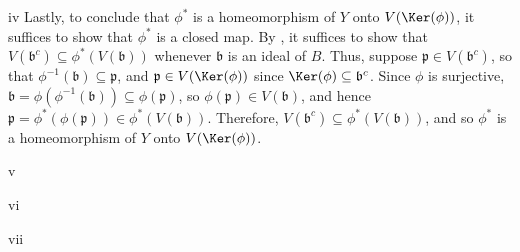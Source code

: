 \begin{partsolution}{iv}
Lastly, to conclude that \(\phi^*\) is a homeomorphism of \(Y\) onto \(V(\Ker(\phi))\), it suffices to show that \(\phi^*\) is a closed map.
By , it suffices to show that \(V(\mathfrak{b}^c) \subseteq \phi^*(V(\mathfrak{b}))\) whenever \(\mathfrak{b}\) is an ideal of \(B\).
Thus, suppose \(\mathfrak{p} \in V(\mathfrak{b}^c)\), so that \(\phi^{-1}(\mathfrak{b}) \subseteq \mathfrak{p}\), and \(\mathfrak{p} \in V(\Ker(\phi))\) since \(\Ker(\phi) \subseteq \mathfrak{b}^c\).
Since \(\phi\) is surjective, \(\mathfrak{b} = \phi(\phi^{-1}(\mathfrak{b})) \subseteq \phi(\mathfrak{p})\), so \(\phi(\mathfrak{p}) \in V(\mathfrak{b})\), and hence \(\mathfrak{p} = \phi^*(\phi(\mathfrak{p})) \in \phi^*(V(\mathfrak{b}))\).
Therefore, \(V(\mathfrak{b}^c) \subseteq \phi^*(V(\mathfrak{b}))\), and so \(\phi^*\) is a homeomorphism of \(Y\) onto \(V(\Ker(\phi))\).
\end{partsolution}

\begin{partsolution}{v}

\end{partsolution}

\begin{partsolution}{vi}

\end{partsolution}

\begin{partsolution}{vii}

\end{partsolution}